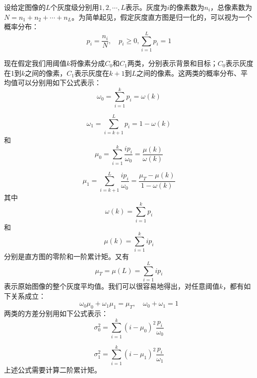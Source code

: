 设给定图像的$L$个灰度级分别用$1,2,\cdots,L$表示。灰度为$i$的像素数为$n_i$，总像素数为$N=n_1+n_2+\cdots+n_L$。为简单起见，假定灰度直方图是归一化的，可以视为一个概率分布：
\begin{equation}
  \label{eq:1}
  p_i=\frac{n_i}{N},\quad p_i\geqslant 0,\sum_{i=1}^Lp_i=1
\end{equation}

现在假定我们用阈值$k$将像素分成$C_0$和$C_1$两类，分别表示背景和目标；$C_0$表示灰度在1到$k$之间的像素，$C_1$表示灰度在$k+1$到$L$之间的像素。这两类的概率分布、平均值可以分别用如下公式表示：
\begin{equation}
  \label{eq:2}
  \omega_0=\sum_{i=1}^kp_i=\omega(k)
\end{equation}

\begin{equation}
  \label{eq:3}
  \omega_1=\sum_{i=k+1}^Lp_i=1-\omega(k)
\end{equation}
和
\begin{equation}
  \label{eq:4}
  \mu_0=\sum_{i=1}^k\frac{ip_i}{\omega_0}=\frac{\mu(k)}{\omega(k)}
\end{equation}

\begin{equation}
  \label{eq:5}
  \mu_1=\sum_{i=k+1}^L\frac{ip_i}{\omega_0}=\frac{\mu_T-\mu(k)}{1-\omega(k)}
\end{equation}
其中
\begin{equation}
  \label{eq:6}
  \omega(k)=\sum_{i=1}^kp_i
\end{equation}
和
\begin{equation}
  \label{eq:7}
  \mu(k)=\sum_{i=1}^kip_i
\end{equation}
分别是直方图的零阶和一阶累计矩。又有
\begin{equation}
  \label{eq:8}
  \mu_T=\mu(L)=\sum_{i=1}^Lip_i
\end{equation}
表示原始图像的整个灰度平均值。我们可以很容易地得出，对任意阈值$k$，都有如下关系成立：
\begin{equation}
  \label{eq:9}
  \omega_0\mu_0+\omega_1\mu_1=\mu_T,\quad\omega_0+\omega_1=1
\end{equation}
两类的方差分别用如下公式表示：
\begin{equation}
  \label{eq:10}
  \sigma_0^2=\sum_{i=1}^k(i-\mu_0)^2\frac{p_i}{\omega_0}
\end{equation}

\begin{equation}
  \label{eq:11}
  \sigma_1^2=\sum_{i=1}^k(i-\mu_1)^2\frac{p_i}{\omega_1}
\end{equation}
上述公式需要计算二阶累计矩。

